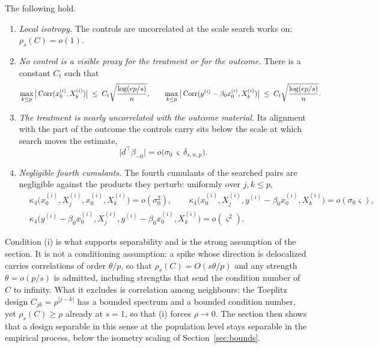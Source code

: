 \begin{assumption}\label{ass:plugin}
The following hold.
\begin{enumerate}
\item[(i)] \emph{Local isotropy.} The controls are uncorrelated at the
scale search works on: $\rho_s(C) = o(1)$.
\item[(ii)] \emph{No control is a visible proxy for the treatment or
for the outcome.} There is a constant $C_t$ such that
\begin{equation*}
        \max_{k \le p} \big| \operatorname{Corr}(x_0^{(i)}, X_k^{(i)}) \big|
        \;\le\; C_t \sqrt{\frac{\log(ep/s)}{n}},
        \qquad
        \max_{k \le p}
        \big| \operatorname{Corr}(y^{(i)} - \beta_0 x_0^{(i)}, X_k^{(i)}) \big|
        \;\le\; C_t \sqrt{\frac{\log(ep/s)}{n}} .
\end{equation*}
\item[(iii)] \emph{The treatment is nearly uncorrelated with the outcome
material.} Its alignment with the part of the outcome the controls carry
sits below the scale at which search moves the estimate,
\begin{equation*}
        \big| d^\top \beta_{-0} \big|
        = o\big( \sigma_0\, \varsigma\, \delta_{s,n,p} \big).
\end{equation*}
\item[(iv)] \emph{Negligible fourth cumulants.} The fourth cumulants of
the searched pairs are negligible against the products they perturb:
uniformly over $j, k \le p$,
\begin{equation*}
\begin{aligned}
        &\kappa_4\big(x_0^{(i)}, X_j^{(i)}, x_0^{(i)}, X_k^{(i)}\big)
        = o(\sigma_0^2),
        \qquad
        \kappa_4\big(x_0^{(i)}, X_j^{(i)},
        y^{(i)} - \beta_0 x_0^{(i)}, X_k^{(i)}\big)
        = o(\sigma_0 \varsigma),
        \\
        &\kappa_4\big(y^{(i)} - \beta_0 x_0^{(i)}, X_j^{(i)},
        y^{(i)} - \beta_0 x_0^{(i)}, X_k^{(i)}\big)
        = o(\varsigma^2).
\end{aligned}
\end{equation*}
\end{enumerate}
\end{assumption}

Condition (i) is what supports separability and is the strong
assumption of the section. It is not a conditioning assumption: a spike
whose direction is delocalized carries correlations of order $\theta/p$,
so that $\rho_s(C) = O(s \theta / p)$ and any strength $\theta = o(p/s)$
is admitted, including strengths that send the condition number of $C$ to
infinity. What it excludes is correlation among neighbours: the Toeplitz
design $C_{jk} = \rho^{|j-k|}$ has a bounded spectrum and a bounded
condition number, yet $\rho_s(C) \ge \rho$ already at $s = 1$, so that
(i) forces $\rho \to 0$. The section then shows that a design separable
in this sense at the population level stays separable in the empirical
process, below the isometry scaling of Section~\ref{sec:bounds}.

